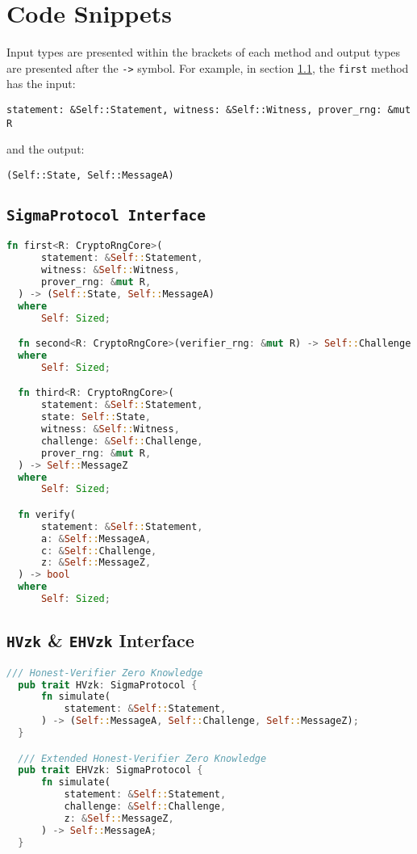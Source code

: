 \appendix
{}%
\chapter{Code Snippets}\label{ch:code-snippets}
Input types are presented within the brackets of each method and 
output types are presented after the \texttt{->} symbol. For example, in section \ref{code:SigmaProtocol}, 
the \texttt{first} method has the input:

\texttt{statement: \&Self::Statement, witness: \&Self::Witness, prover\_rng: \&mut R}

and the output: 

\texttt{(Self::State, Self::MessageA)}

\section{\texttt{SigmaProtocol Interface}}
\label{code:SigmaProtocol}
\begin{lstlisting}[language=rust]
  fn first<R: CryptoRngCore>(
      statement: &Self::Statement,
      witness: &Self::Witness,
      prover_rng: &mut R,
  ) -> (Self::State, Self::MessageA)
  where
      Self: Sized;

  fn second<R: CryptoRngCore>(verifier_rng: &mut R) -> Self::Challenge
  where
      Self: Sized;

  fn third<R: CryptoRngCore>(
      statement: &Self::Statement,
      state: Self::State,
      witness: &Self::Witness,
      challenge: &Self::Challenge,
      prover_rng: &mut R,
  ) -> Self::MessageZ
  where
      Self: Sized;

  fn verify(
      statement: &Self::Statement,
      a: &Self::MessageA,
      c: &Self::Challenge,
      z: &Self::MessageZ,
  ) -> bool
  where
      Self: Sized;
\end{lstlisting}

\section{\texttt{HVzk} \& \texttt{EHVzk} Interface}
\label{code:hvzk}

\begin{lstlisting}[language=rust]
  /// Honest-Verifier Zero Knowledge
  pub trait HVzk: SigmaProtocol {
      fn simulate(
          statement: &Self::Statement,
      ) -> (Self::MessageA, Self::Challenge, Self::MessageZ);
  }

  /// Extended Honest-Verifier Zero Knowledge
  pub trait EHVzk: SigmaProtocol {
      fn simulate(
          statement: &Self::Statement,
          challenge: &Self::Challenge,
          z: &Self::MessageZ,
      ) -> Self::MessageA;
  }
\end{lstlisting}

